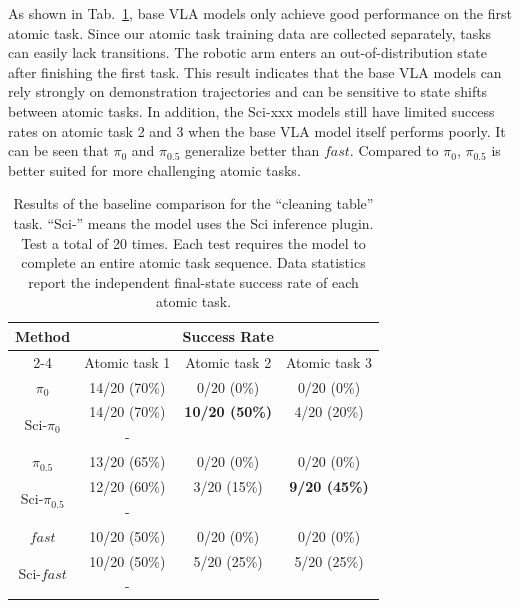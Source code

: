\documentclass[letterpaper]{article} %
\begin{document}
As shown in Tab.~\ref{tab:cleaning}, base VLA models only achieve good performance on the first atomic task.
Since our atomic task training data are collected separately, tasks can easily lack transitions.
The robotic arm enters an out-of-distribution state after finishing the first task.
This result indicates that the base VLA models can rely strongly on demonstration trajectories and can be sensitive to state shifts between atomic tasks.
In addition, the Sci-xxx models still have limited success rates on atomic task 2 and 3 when the base VLA model itself performs poorly. It can be seen that $\pi_0$ and $\pi_{0.5}$ generalize better than $fast$.
Compared to $\pi_0$, $\pi_{0.5}$ is better suited for more challenging atomic tasks.



\begin{table}[!t]
\begin{tabular}{cccc}
\toprule
\multirow{2}{*}{Method}&\multicolumn{3}{c}{Success Rate}\\
\cline{2-4}
&Atomic task 1&Atomic task 2&Atomic task 3\\
\midrule
$\pi_0$  & 14/20 (70\%) & 0/20 (0\%) & 0/20 (0\%)\\
\multirow{2}{*}{Sci-$\pi_0$} & \cellcolor{gray!25}14/20 (70\%) & \cellcolor{gray!25}\textbf{10/20 (50\%)} & \cellcolor{gray!25}4/20 (20\%)\\
&\cellcolor{gray!25}-&\cellcolor{gray!25}{\color{violet}$50\%\uparrow$}&\cellcolor{gray!25}{\color{violet}$20\%\uparrow$}\\ \hline

$\pi_{0.5}$  &13/20 (65\%) & 0/20 (0\%) & 0/20 (0\%) \\
\multirow{2}{*}{Sci-$\pi_{0.5}$} &\cellcolor{gray!25}12/20 (60\%)&\cellcolor{gray!25}3/20 (15\%)& \cellcolor{gray!25}\textbf{9/20 (45\%)}\\
&\cellcolor{gray!25}-&\cellcolor{gray!25}{\color{violet}$15\%\uparrow$}&\cellcolor{gray!25}{\color{violet}$45\%\uparrow$}\\ \hline

$fast$  &10/20 (50\%) & 0/20 (0\%) & 0/20 (0\%) \\
\multirow{2}{*}{Sci-$fast$} &\cellcolor{gray!25}10/20 (50\%) & \cellcolor{gray!25}5/20 (25\%) & \cellcolor{gray!25}5/20 (25\%) \\
&\cellcolor{gray!25}-&\cellcolor{gray!25}{\color{violet}$25\%\uparrow$}&\cellcolor{gray!25}{\color{violet}$25\%\uparrow$}\\
\bottomrule
\end{tabular}
\caption{Results of the baseline comparison for the ``cleaning table'' task. ``Sci-'' means the model uses the Sci inference plugin. Test a total of 20 times. Each test requires the model to complete an entire atomic task sequence. Data statistics report the independent final-state success rate of each atomic task.}
\label{tab:cleaning}
\end{table}
\end{document}
